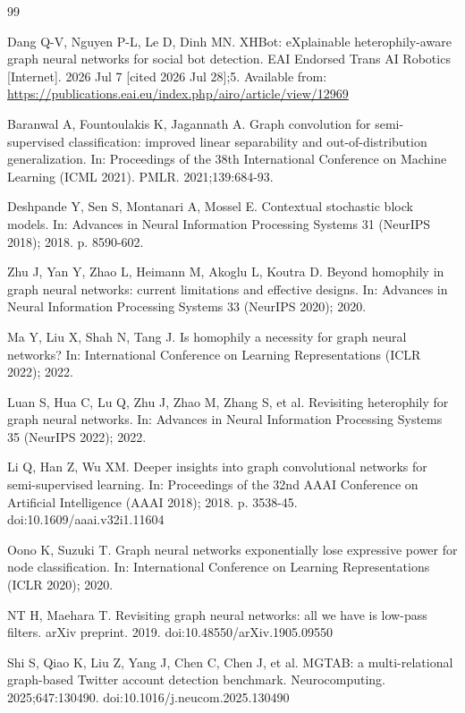 \documentclass[fonts]{icst}
\theoremstyle{definition}
\begin{document}
\begin{thebibliography}{99}

Dang Q-V, Nguyen P-L, Le D, Dinh MN. XHBot: eXplainable heterophily-aware graph neural networks for social bot detection. EAI Endorsed Trans AI Robotics [Internet]. 2026 Jul 7 [cited 2026 Jul 28];5. Available from: \url{https://publications.eai.eu/index.php/airo/article/view/12969}

Baranwal A, Fountoulakis K, Jagannath A. Graph convolution for semi-supervised classification: improved linear separability and out-of-distribution generalization. In: Proceedings of the 38th International Conference on Machine Learning (ICML 2021). PMLR. 2021;139:684-93.

Deshpande Y, Sen S, Montanari A, Mossel E. Contextual stochastic block models. In: Advances in Neural Information Processing Systems 31 (NeurIPS 2018); 2018. p. 8590-602.

Zhu J, Yan Y, Zhao L, Heimann M, Akoglu L, Koutra D. Beyond homophily in graph neural networks: current limitations and effective designs. In: Advances in Neural Information Processing Systems 33 (NeurIPS 2020); 2020.

Ma Y, Liu X, Shah N, Tang J. Is homophily a necessity for graph neural networks? In: International Conference on Learning Representations (ICLR 2022); 2022.

Luan S, Hua C, Lu Q, Zhu J, Zhao M, Zhang S, et al. Revisiting heterophily for graph neural networks. In: Advances in Neural Information Processing Systems 35 (NeurIPS 2022); 2022.

Li Q, Han Z, Wu XM. Deeper insights into graph convolutional networks for semi-supervised learning. In: Proceedings of the 32nd AAAI Conference on Artificial Intelligence (AAAI 2018); 2018. p. 3538-45. doi:10.1609/aaai.v32i1.11604

Oono K, Suzuki T. Graph neural networks exponentially lose expressive power for node classification. In: International Conference on Learning Representations (ICLR 2020); 2020.

NT H, Maehara T. Revisiting graph neural networks: all we have is low-pass filters. arXiv preprint. 2019. doi:10.48550/arXiv.1905.09550

Shi S, Qiao K, Liu Z, Yang J, Chen C, Chen J, et al. MGTAB: a multi-relational graph-based Twitter account detection benchmark. Neurocomputing. 2025;647:130490. doi:10.1016/j.neucom.2025.130490


\end{thebibliography}
\end{document}
